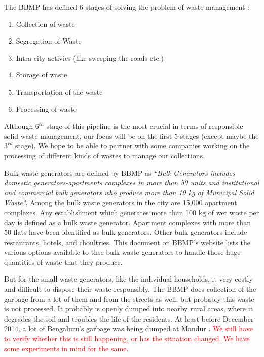 \documentclass[10pt]{article}
\begin{document}
The BBMP has defined 6 stages of solving the problem of waste management \citep{BBMP:SWMOverview}:
\begin{enumerate}
\item Collection of waste
\item Segregation of Waste
\item Intra-city activies (like sweeping the roads etc.)
\item Storage of waste
\item Transportation of the waste
\item Processing of waste
\end{enumerate}
Although $6^{th}$ stage of this pipeline is the most crucial in terms of responsible solid waste management, our focus will be on the first 5 stages (except maybe the $3^{rd}$ stage). We hope to be able to partner with some companies working on the processing of different kinds of wastes to manage our collections.

Bulk waste generators are defined by BBMP as \emph{``Bulk Generators includes domestic generators-apartments complexes in more than 50 units and institutional and commercial bulk generators who produce more than 10 kg of Municipal Solid Waste"}. Among the bulk waste generators in the city are 15,000 apartment complexes. Any establishment which generates more than 100 kg of wet waste per day is defined as a bulk waste generator. Apartment complexes with more than 50 flats have been identified as bulk generators. Other bulk generators include restaurants, hotels, and choultries\citep{BangaloreMirror:bulk_waste_generators}. \href{http://bbmp.gov.in/documents/10180/2201631/Approved+Vendor+List+with+note+for+Website+21-06-2016.pdf/34567fdf-8d69-4b12-8440-9475ba4a0567}{This document on BBMP's website} lists the various options available to thse bulk waste generators to handle those huge quantities of waste that they produce.

But for the small waste generators, like the individual households, it very costly and difficult to dispose their waste responsibly. The BBMP does collection of the garbage from a lot of them and from the streets as well, but probably this waste is not processed. It probably is openly dumped into nearby rural areas, where it degrades the soil and troubles the life of the residents. At least before December 2014, a lot of Bengaluru's garbage was being dumped at Mandur \citep{BangaloreMirror:bulk_waste_generators}.
\textcolor{red}{We still have to verify whether this is still happening, or has the situation changed. We have some experiments in mind for the same.}
\end{document}
